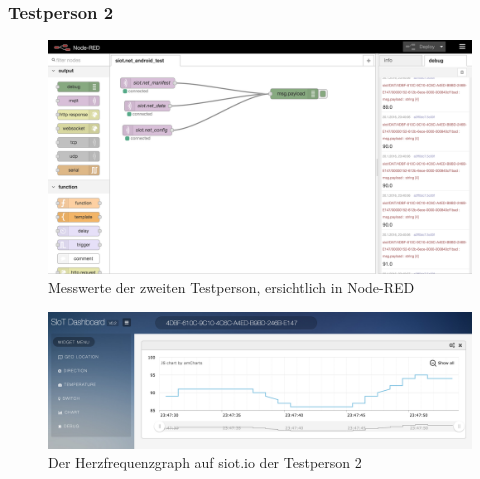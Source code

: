 \subsubsection{Testperson 2}
\begin{figure}[H]
  \centering
  \includegraphics[scale=0.375]{98_Bilder/11_Ergebnis/heartrateCRnodeRED}
  \caption[Node-RED Messwerte Person 2]{Messwerte der zweiten Testperson, ersichtlich in Node-RED}
\end{figure}
\begin{figure}[H]
  \centering
  \includegraphics[scale=0.375]{98_Bilder/11_Ergebnis/heartrateCRsiotio}
  \caption[siot.io Dashboard Graph Person 2]{Der Herzfrequenzgraph auf siot.io der Testperson 2}
\end{figure}
